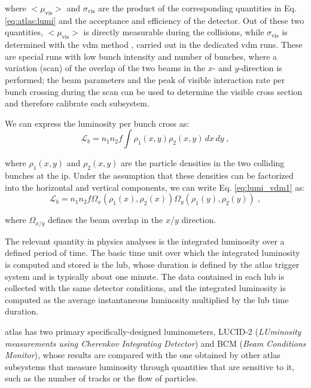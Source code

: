 \noindent where $<\mu_\mathrm{vis}>$ and $\sigma_{\mathrm{vis}}$ are the product of the corresponding quantities in Eq. \ref{eq:atlas:lumi} and the acceptance and efficiency of the detector. Out of these two quantities, $<\mu_\mathrm{vis}>$ is directly measurable during the collisions, while $\sigma_{\mathrm{vis}}$ is determined with the \gls{vdm} method \cite{vanderMeer:296752}, carried out in the dedicated \gls{vdm} runs. These are special runs with low bunch intensity and number of bunches, where a variation (scan) of the overlap of the two beams in the $x$- and $y$-direction is performed; the beam parameters and the peak of visible interaction rate per bunch crossing during the scan can be used to determine the visible cross section and therefore calibrate each subsystem. 

We can express the luminosity per bunch cross as:
\begin{equation}
\mathcal{L}_b = n_1 n_2 f \int \rho_1(x,y) \rho_2(x,y) \, dx \, dy \; ,
\label{eq:lumi_vdm1}
\end{equation}

\noindent where $\rho_1(x,y)$ and $\rho_2(x,y)$ are the particle densities in the two colliding bunches at the \gls{ip}. 
Under the assumption that these densities can be factorized into the horizontal and vertical components, we can write Eq. \ref{eq:lumi_vdm1} as:
\begin{equation}
\mathcal{L}_b = n_1 n_2 f  \Omega_x(\rho_1(x), \rho_2(x)) \Omega_y(\rho_1(y), \rho_2(y))  \; ,
\label{eq:lumi_vdm1}
\end{equation}

\noindent where $\Omega_{x/y}$ defines the beam overlap in the $x$/$y$ direction.

The relevant quantity in physics analyses is the integrated luminosity over a defined period of time. The basic time unit over which the integrated luminosity is computed and stored is the \gls{lub}, whose duration is defined by the \gls{atlas} trigger system and is typically about one minute. The data contained in each \gls{lub} is collected with the same detector conditions, and the integrated luminosity is computed as the average instantaneous luminosity multiplied by the \gls{lub} time duration.

\gls{atlas} has two primary specifically-designed luminometers, LUCID-2 (\textit{LUminosity measurements using Cherenkov Integrating Detector}) and BCM (\textit{Beam Conditions Monitor}), whose results are compared with the one obtained by other \gls{atlas} subsystems that measure luminosity through quantities that are sensitive to it, such as the number of tracks or the flow of particles.

